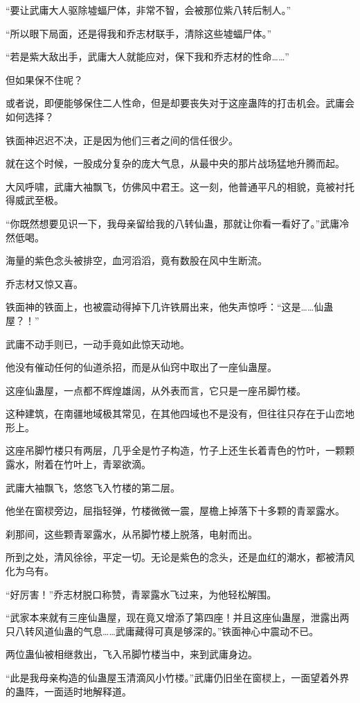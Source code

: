 \begin{this_body}
“要让武庸大人驱除墟蝠尸体，非常不智，会被那位紫八转后制人。”

“所以眼下局面，还是得我和乔志材联手，清除这些墟蝠尸体。”

“若是紫大敌出手，武庸大人就能应对，保下我和乔志材的性命……”

但如果保不住呢？

或者说，即便能够保住二人性命，但是却要丧失对于这座蛊阵的打击机会。武庸会如何选择？

铁面神迟迟不决，正是因为他们三者之间的信任很少。

就在这个时候，一股成分复杂的庞大气息，从最中央的那片战场猛地升腾而起。

大风呼啸，武庸大袖飘飞，仿佛风中君王。这一刻，他普通平凡的相貌，竟被衬托得威武至极。

“你既然想要见识一下，我母亲留给我的八转仙蛊，那就让你看一看好了。”武庸冷然低喝。

海量的紫色念头被排空，血河滔滔，竟有数股在风中生断流。

乔志材又惊又喜。

铁面神的铁面上，也被震动得掉下几许铁屑出来，他失声惊呼：“这是……仙蛊屋？！”

武庸不动手则已，一动手竟如此惊天动地。

他没有催动任何的仙道杀招，而是从仙窍中取出了一座仙蛊屋。

这座仙蛊屋，一点都不辉煌雄阔，从外表而言，它只是一座吊脚竹楼。

这种建筑，在南疆地域极其常见，在其他四域也不是没有，但往往只存在于山峦地形上。

这座吊脚竹楼只有两层，几乎全是竹子构造，竹子上还生长着青色的竹叶，一颗颗露水，附着在竹叶上，青翠欲滴。

武庸大袖飘飞，悠悠飞入竹楼的第二层。

他坐在窗棂旁边，屈指轻弹，竹楼微微一震，屋檐上掉落下十多颗的青翠露水。

刹那间，这些颗青翠露水，从吊脚竹楼上脱落，电射而出。

所到之处，清风徐徐，平定一切。无论是紫色的念头，还是血红的潮水，都被清风化为乌有。

“好厉害！”乔志材脱口称赞，青翠露水飞过来，为他轻松解围。

“武家本来就有三座仙蛊屋，现在竟又增添了第四座！并且这座仙蛊屋，泄露出两只八转风道仙蛊的气息……武庸藏得可真是够深的。”铁面神心中震动不已。

两位蛊仙被相继救出，飞入吊脚竹楼当中，来到武庸身边。

“此是我母亲构造的仙蛊屋玉清滴风小竹楼。”武庸仍旧坐在窗棂上，一面望着外界的蛊阵，一面适时地解释道。


\end{this_body}
